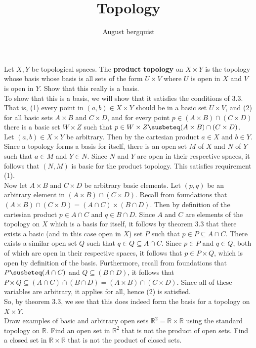 \documentclass{article}
\title{Topology}
\author{August bergquist}
\newcommand{\R}{\mathbb{R}}
\begin{document}
 Let $X,Y$ be topological spaces. The \textbf{product topology} on $X\times Y$ is the topology whose basis whose basis is all sets of the form $U\times V$ where $U$ is open in $X$ and $V$ is open in $Y$. Show that this really is a basis.\\

 To show that this is a basis, we will show that it satisfies the conditions of 3.3. That is, (1) every point in $(a,b)\in X\times Y$ should be in a basic set $U\times V$, and (2) for all basic sets $A\times B$ and $C\times D$, and for every point $p\in (A\times B )\cap (C\times D)$ there is a basic set $W\times Z$ such that $p\in W\times Z \susbeteq (A\times B )\cap (C\times D)$. \\

Let $(a,b)\in X\times Y$ be arbitrary. Then by the cartesian product $a\in X$ and $b\in Y$. Since a topology forms a basis for itself, there is an open set $M$ of $X$ and $N$ of $Y$ such that $a\in M$ and $Y\in N$. Since $N$ and $Y$ are open in their respective spaces, it follows that $(N,M)$ is basic for the product topology. This satisfies requirement (1).\\

Now let $A\times B$ and $C\times D$ be arbitrary basic elements. Let $(p,q)$ be an arbitrary element in $(A\times B)\cap(C\times D)$. Recall from foundations that $(A\times B)\cap (C\times D) = (A\cap C)\times (B\cap D).$ Then by definition of the cartesian product $p\in A\cap C$ and $q\in B\cap D$. Since $A$ and $C$ are elements of the topology on $X$ which is a basis for itself, it follows by theorem 3.3 that there exists a basic (and in this case open in $X$) set $ P$ such that $p\in P\subseteq A\cap C$. There exists a similar open set $Q$ such that $q\in Q\subseteq A\cap C$. Since $p\in P$ and $q\in Q$, both of which are open in their respective spaces, it follows that $p\in P\times Q$, which is open by definition of the basis. Furthermore, recall from foundations that $P\susbeteq (A\cap C)$ and $Q\subseteq (B\cap D)$, it follows that $P\times Q \subseteq (A\cap C) \cap (B\cap D) = (A\times B ) \cap (C\times D).$ Since all of these variables are arbitrary, it applies for all, hence (2) is satisfied.\\

So, by theorem 3.3, we see that this does indeed form the basis for a topology on $X\times Y$.\\


 Draw examples of basic and arbitrary open sets $\R^2 = \R\times \R$ using the standard topology on $\R$. Find an open set in $\R^2$ that is not the product of open sets. Find a closed set in $\R\times \R$ that is not the product of closed sets.\\
\end{document}

